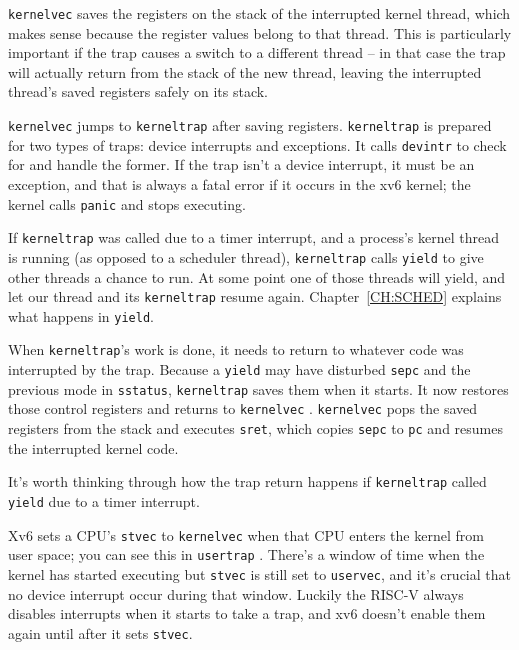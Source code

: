 {\tt kernelvec} saves the registers on the stack of the interrupted
kernel thread, which makes sense because the register values belong to
that thread. This is particularly important if the trap causes a
switch to a different thread -- in that case the trap will actually
return from the stack of the new thread, leaving the interrupted
thread's saved registers safely on its stack.

{\tt kernelvec} jumps to {\tt kerneltrap}
 after saving registers.
{\tt kerneltrap} is prepared for two types of traps:
device interrupts and exceptions. It calls
{\tt devintr}
to check for and handle the former.
If the trap isn't a device interrupt, it must be an exception,
and that is always a fatal error if it occurs in the xv6 kernel;
the kernel calls \lstinline{panic} and stops executing.

If {\tt kerneltrap} was called due to a timer interrupt, and a
process's kernel thread is running (as opposed to a scheduler thread),
{\tt kerneltrap} calls {\tt yield} to give other threads a chance to
run. At some point one of those threads will yield, and let our thread
and its {\tt kerneltrap} resume again.
Chapter~\ref{CH:SCHED} explains what happens in {\tt yield}.

When {\tt kerneltrap}'s work is done, it needs to return to whatever
code was interrupted by the trap. Because a {\tt yield} may have
disturbed {\tt sepc} and the previous mode in {\tt sstatus},
{\tt kerneltrap} saves them when it starts. It now restores those
control registers and returns to {\tt kernelvec}
.
{\tt kernelvec} pops the saved registers from the stack and
executes {\tt sret}, which copies {\tt sepc} to {\tt pc}
and resumes the interrupted kernel code.

It's worth thinking through how the trap return happens if
{\tt kerneltrap} called {\tt yield} due to a timer interrupt.

Xv6 sets a CPU's {\tt stvec} to {\tt kernelvec} when that CPU
enters the kernel from user space; you can see this in {\tt usertrap}
.
There's a window of time when the kernel has started executing
but {\tt stvec} is still set to {\tt uservec}, and it's crucial that 
no device interrupt occur during that window.
Luckily the RISC-V always disables interrupts when it starts
to take a trap, and xv6 doesn't enable them again until
after it sets {\tt stvec}.

